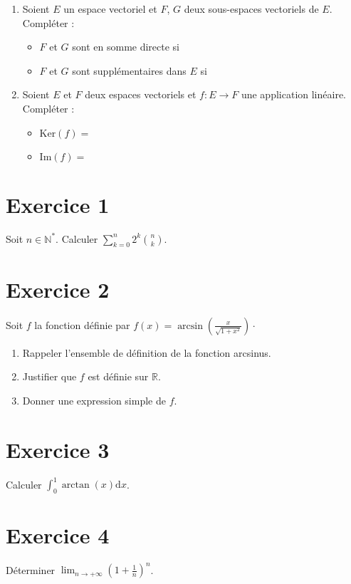 \documentclass[twoside,french,11pt]{VcCours}
\begin{document}
\begin{enumerate}
\medskip
\item Soient $E$ un espace vectoriel et $F$, $G$ deux sous-espaces vectoriels de $E$. Compléter :

\medskip
\begin{itemize}
\item $F$ et $G$ sont en somme directe si 

\bigskip
\item $F$ et $G$ sont supplémentaires dans $E$ si 
\end{itemize}

\medskip
\item Soient $E$ et $F$ deux espaces vectoriels et $f : E \rightarrow F$ une application linéaire. Compléter :

\medskip
\begin{itemize}
\item $\textrm{Ker}(f) =$

\bigskip
\item $\textrm{Im}(f) = $
\end{itemize}
\end{enumerate}

\newpage
\section*{Exercice 1}
Soit $n \in \mathbb{N}^*$. Calculer $\sum_{k=0}^{n} 2^k \binom{n}{k}$.

\section*{Exercice 2}
Soit $f$ la fonction définie par $f(x) =  \arcsin \left( \frac{x}{\sqrt {1 + x^{2}}} \right) \cdot$

\begin{enumerate}
\item Rappeler l'ensemble de définition de la fonction arcsinus.
\item Justifier que $f$ est définie sur $\mathbb{R}$.
\item Donner une expression simple de $f$.
\end{enumerate}

\medskip
\section*{Exercice 3}
Calculer $\int_{0}^{1} \arctan(x) \text{d}x$.

\medskip
\section*{Exercice 4}
Déterminer $\lim_{n \rightarrow + \infty} \left( 1+ \frac{1}{n} \right)^n$.
\end{document}
